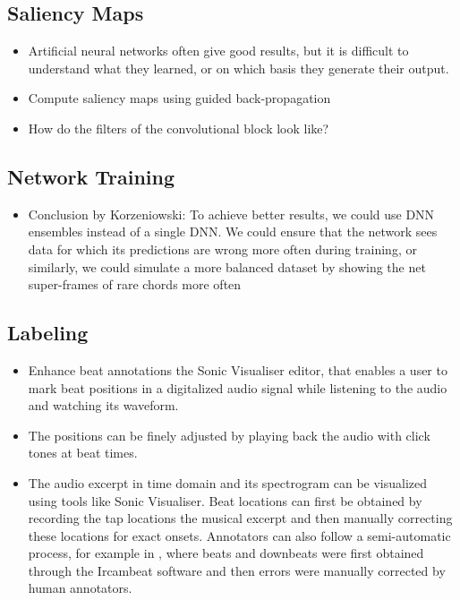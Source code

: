 \documentclass{scrartcl}
\begin{document}
\subsection{Saliency Maps}

\begin{itemize}
\item Artificial neural networks often give good results, but it is difficult to understand what they learned, or on which basis they generate their output.
\item Compute saliency maps using guided back-propagation \cite{Springenberg2014}
\item How do the filters of the convolutional block look like?
\end{itemize}


\subsection{Network Training}

\begin{itemize}
\item Conclusion by Korzeniowski: To achieve better results, we could use DNN ensembles instead of a single DNN. We could ensure that the network sees data for which its predictions are wrong more often during training, or similarly, we could simulate a more balanced dataset by showing the net super-frames of rare chords more often \cite{Korzeniowski2016}
\end{itemize}


\subsection{Labeling}

\begin{itemize}
\item Enhance beat annotations the Sonic Visualiser \cite{SonicVisualiser} editor, that enables a user to mark beat positions in a digitalized audio signal while listening to the audio and watching its waveform.
\item The positions can be finely adjusted by playing back the audio with click tones at beat times.
\item The audio excerpt in time domain and its spectrogram can be visualized using tools like Sonic Visualiser. Beat locations can first be obtained by recording the tap locations the musical excerpt and then manually correcting these locations for exact onsets.  Annotators can also follow a semi-automatic process, for example in \cite{Peeters2010}, where beats and downbeats were first obtained through the Ircambeat software and then errors were manually corrected by human annotators.
\end{itemize}
\end{document}
